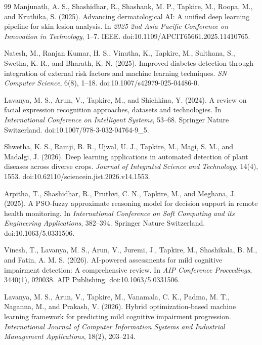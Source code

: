 \documentclass[12pt,a4paper]{article}
\begin{document}
\begin{thebibliography}{99}
Manjunath, A. S., Shashidhar, R., Shashank, M. P., Tapkire, M., Roopa, M., and Kruthika, S. (2025). Advancing dermatological AI: A unified deep learning pipeline for skin lesion analysis. In \textit{2025 2nd Asia Pacific Conference on Innovation in Technology}, 1--7. IEEE. doi:10.1109/APCIT65661.2025.11410765.

Natesh, M., Ranjan Kumar, H. S., Vinutha, K., Tapkire, M., Sulthana, S., Swetha, K. R., and Bharath, K. N. (2025). Improved diabetes detection through integration of external risk factors and machine learning techniques. \textit{SN Computer Science}, 6(8), 1--18. doi:10.1007/s42979-025-04486-0.

Lavanya, M. S., Arun, V., Tapkire, M., and Shichkina, Y. (2024). A review on facial expression recognition approaches, datasets and technologies. In \textit{International Conference on Intelligent Systems}, 53--68. Springer Nature Switzerland. doi:10.1007/978-3-032-04764-9\_5.

Shwetha, K. S., Ramji, B. R., Ujwal, U. J., Tapkire, M., Magi, S. M., and Madalgi, J. (2026). Deep learning applications in automated detection of plant diseases across diverse crops. \textit{Journal of Integrated Science and Technology}, 14(4), 1553. doi:10.62110/sciencein.jist.2026.v14.1553.

Arpitha, T., Shashidhar, R., Pruthvi, C. N., Tapkire, M., and Meghana, J. (2025). A PSO-fuzzy approximate reasoning model for decision support in remote health monitoring. In \textit{International Conference on Soft Computing and its Engineering Applications}, 382--394. Springer Nature Switzerland. doi:10.1063/5.0331506.

Vinesh, T., Lavanya, M. S., Arun, V., Juremi, J., Tapkire, M., Shashikala, B. M., and Fatin, A. M. S. (2026). AI-powered assessments for mild cognitive impairment detection: A comprehensive review. In \textit{AIP Conference Proceedings}, 3440(1), 020038. AIP Publishing. doi:10.1063/5.0331506.

Lavanya, M. S., Arun, V., Tapkire, M., Vanamala, C. K., Padma, M. T., Naganna, M., and Prakash, V. (2026). Hybrid optimization-based machine learning framework for predicting mild cognitive impairment progression. \textit{International Journal of Computer Information Systems and Industrial Management Applications}, 18(2), 203--214.

\end{thebibliography}
\end{document}
